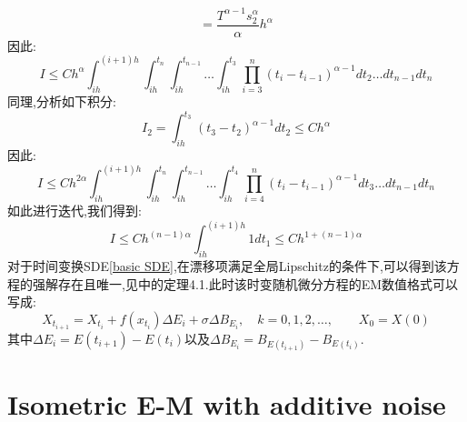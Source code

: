 \documentclass[12pt,final]{article}
\makeatletter
\numberwithin{equation}{section}
\numberwithin{figure}{section}
\numberwithin{table}{section}
\theoremstyle{plain}
\renewcommand{\proofname}{proof}
\theoremstyle{Definition}
\theoremstyle{Remark}
\renewenvironment{proof}[1][\proofname]{\par
	\pushQED{\qed}%
	\normalfont \topsep6\p@\@plus6\p@\relax
	\trivlist\item[\hskip\labelsep
	\bfseries #1\@addpunct{\,:\,}]\ignorespaces
}{%
	\popQED\endtrivlist\@endpefalse
}
\makeatother
\begin{document}
\begin{proof}
\begin{equation*}
			=  \frac{T^{\alpha - 1}s_{2}^\alpha}{\alpha}h^{\alpha}
		\end{equation*}
		因此:
		\begin{equation*}
			I \le Ch^\alpha
			\int_{ih}^{(i+1)h}\int_{ih}^{t_n}\int_{ih}^{t_{n-1}} \ldots \int_{ih}^{t_{3}} 
			\prod_{i=3}^{n}(t_i-t_{i-1})^{\alpha -1} dt_{2} \ldots dt_{n-1}dt_n
		\end{equation*}
		同理,分析如下积分:
		\begin{equation*}
			I_{2} = \int_{ih}^{t_{3}}(t_{3}-t_{2})^{\alpha -1}
			dt_{2} \le Ch^\alpha 
		\end{equation*}
		因此:
		\begin{equation*}
			I \le Ch^{2\alpha}
			\int_{ih}^{(i+1)h}\int_{ih}^{t_n}\int_{ih}^{t_{n-1}} \ldots \int_{ih}^{t_{4}} 
			\prod_{i=4}^{n}(t_i-t_{i-1})^{\alpha -1} dt_{3} \ldots dt_{n-1}dt_n
		\end{equation*}
		如此进行迭代,我们得到:
		\begin{equation*}
			I \le Ch^{(n-1)\alpha}\int_{ih}^{(i+1)h} 1 dt_1 \le Ch^{1+(n-1)\alpha}
		\end{equation*}
	\end{proof}
	对于时间变换SDE\eqref{basic SDE},在漂移项满足全局Lipschitz的条件下,可以得到该方程的强解存在且唯一,见\cite{kobayashi2011stochastic}中的定理4.1.此时该时变随机微分方程的EM数值格式可以写成:
	\begin{equation}\label{eq:1}
		X_{t_{i+1}}=X_{t_i}+f(x_{t_i})\Delta E_{i}+\sigma\Delta B_{E_{i}},\quad k=0,1,2,\ldots,\qquad X_0=X(0)
	\end{equation}
	其中$\Delta E_{i}=E(t_{i+1})-E(t_i)$以及$\Delta B_{E_{i}}=B_{E{(t_{i+1})}}-B_{E({t_i})}$.
	
	\section{Isometric E-M with additive noise}
	
\end{document}
